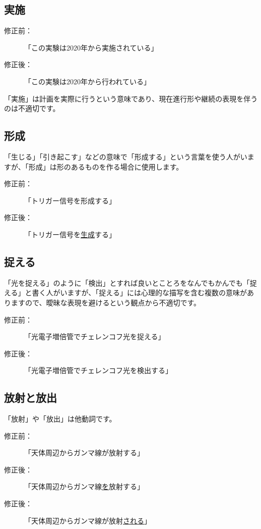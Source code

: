 \subsection{実施}

\begin{description}
\item[修正前：]「この実験は2020年から実施されている」
\item[修正後：]「この実験は2020年から行われている」
\end{description}

「実施」は計画を実際に行うという意味であり、現在進行形や継続の表現を伴うのは不適切です。

\subsection{形成}

「生じる」「引き起こす」などの意味で「形成する」という言葉を使う人がいますが、「形成」は形のあるものを作る場合に使用します。

\begin{description}
\item[修正前：]「トリガー信号を形成する」
\item[修正後：]「トリガー信号を\underline{生成}する」
\end{description}

\subsection{捉える}

「光を捉える」のように「検出」とすれば良いとことろをなんでもかんでも「捉える」と書く人がいますが、「捉える」には心理的な描写を含む複数の意味がありますので、曖昧な表現を避けるという観点から不適切です。

\begin{description}
\item[修正前：]「光電子増倍管でチェレンコフ光を捉える」
\item[修正後：]「光電子増倍管でチェレンコフ光を検出する」
\end{description}

\subsection{放射と放出}

「放射」や「放出」は他動詞です。

\begin{description}
\item[修正前：]「天体周辺からガンマ線が放射する」
\item[修正後：]「天体周辺からガンマ線\underline{を}放射する」
\item[修正後：]「天体周辺からガンマ線が放射\underline{される}」
\end{description}


